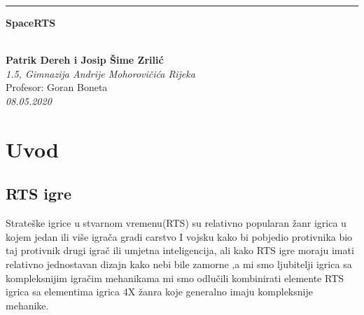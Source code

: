 \documentclass[12pt]{article}
\begin{document}
	
	\begin{titlepage} 
		\raggedleft %
		
		\rule{1pt}{\textheight} %
		\hspace{0.05\textwidth} %
		\parbox[b]{0.9\textwidth}{ %
			{\Huge\Huge\bfseries SpaceRTS}\\[1\baselineskip] %
			\vspace{0.35\textheight}
			\parbox[b]{0.9\textwidth}{
			}
			\\[10\baselineskip]
			{\Large\textbf{Patrik Dereh i Josip Šime Zrilić}}\\
			{\Large\textit{1.5, Gimnazija Andrije Mohorovičića Rijeka}}\\
			{\Large{Profesor: Goran Boneta}}\\
			{\Large\textit{08.05.2020}}
		}
	\end{titlepage}
	
	\renewcommand{\contentsname}{Sadržaj}
	\renewcommand{\listfigurename}{\section{Priložene slike}}
	\renewcommand{\figurename}{\scriptsize{Slika}}
	
	\tableofcontents
	
	\newpage
	\section{Uvod}
	
	\subsection{RTS igre}
	Strateške igrice u stvarnom vremenu(RTS) su relativno popularan žanr igrica u kojem jedan ili više igrača gradi carstvo I vojsku kako bi pobjedio protivnika bio taj protivnik drugi igrač ili umjetna inteligencija, ali kako RTS igre moraju imati relativno jednostavan dizajn kako nebi bile zamorne ,a mi smo ljubitelji igrica sa kompleksnijim igračim mehanikama mi smo odlučili kombinirati elemente RTS igrica sa elementima igrica 4X žanra koje generalno imaju kompleksnije mehanike.
	
\end{document}
